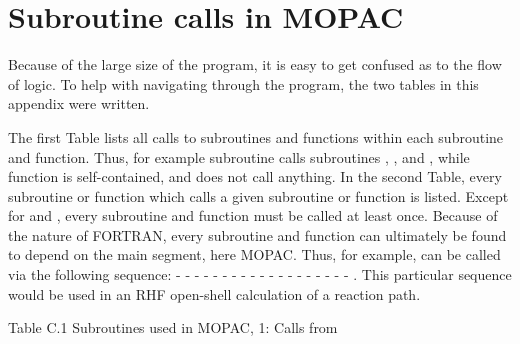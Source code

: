 \chapter{Subroutine calls in MOPAC}
Because of the large size of the program, it is easy to get confused as to the
flow of logic.  To help with navigating through the program, the two tables in
this appendix were written.

The first Table  lists all calls to subroutines and functions within each
subroutine and function.  Thus, for example subroutine  calls
subroutines , , and , while function
 is self-contained, and does not call anything. In the second Table,
every subroutine or function which calls a given subroutine or function is
listed.  Except for  and , every subroutine and
function must be called at least once.  Because of the nature of FORTRAN, every
subroutine and function can ultimately be found to depend on the main segment,
here MOPAC.  Thus, for example,  can be called via the following
sequence:  -  -  -  -
 -  -  -  -   -
 -  -  -  -  -
 -  -   -  -  -
.  This  particular sequence would be used in an RHF open-shell
calculation of a reaction path.

%
%
%
%
%
%
%
%
%
%

\addtocounter{table}{1}
 
\begin{center}Table C.1 Subroutines used in MOPAC, 1: Calls from \end{center}

